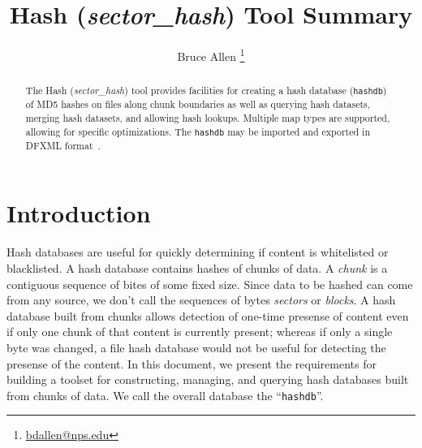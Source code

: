 \documentclass[10pt,twoside]{article}
\newcommand{\sh}{\emph{sector\_hash}\xspace}
\newcommand{\hdb}{\texttt{hashdb}\xspace}
\begin{document}
\title{Hash (\sh) Tool Summary}
\author{Bruce Allen \footnote{\href{mailto:bdallen@nps.edu}{bdallen@nps.edu}}}
\maketitle

\begin{abstract}
The Hash (\sh) tool
provides facilities for creating a hash database (\hdb)
of MD5 hashes on files along chunk boundaries
as well as querying hash datasets,
merging hash datasets,
and allowing hash lookups.
Multiple map types are supported, allowing for specific optimizations.
The \hdb may be imported and exported in DFXML format~\cite{dfxml}.
\end{abstract}


\section{Introduction}
Hash databases are useful for quickly determining if content 
is whitelisted or blacklisted.
A hash database contains hashes of chunks of data.
A \emph{chunk} is a contiguous sequence of bites of some fixed size.  Since data to be
hashed can come from any source, we don't call the sequences of bytes
\emph{sectors} or \emph{blocks}. 
A hash database built from chunks 
allows detection of one-time presense of content even if only one chunk of that
content is currently present; whereas if only a single byte was changed, a file
hash database would not be useful for detecting the presense of the content.
In this document, we present the requirements for building a toolset for
constructing, managing, and querying hash databases built from chunks of data.
We call the overall database the ``\hdb''.
\end{document}
